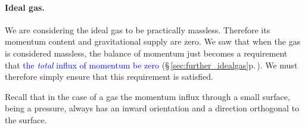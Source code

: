 \documentclass[a4paper,12pt,%
onecolumn,oneside,%
british%
]{memoir}
\renewcommand*{\|}[1][]{\nonscript\:#1\vert\nonscript\:\mathopen{}}
\newcommand*{\sect}{\S}%
\renewcommand*{\autoref}[3][\sect\,\ref]{\textcolor{blue}{#3} {\color{blue}\scriptsize(\faIcon[regular]{eye}\;#1{#2}\;p.\,\pageref{#2})}}
\begin{document}
\bigskip

\paragraph{Ideal gas.}

We are considering the ideal gas to be practically massless. Therefore its momentum content and gravitational supply are zero. We saw that when the gas is considered massless, the balance of momentum just becomes a requirement that \autoref{sec:further_idealgas}{the \emph{total} influx of momentum be zero}. We must therefore simply ensure that this requirement is satisfied.

Recall that in the case of a gas the momentum influx through a small surface, being a pressure, always has an inward orientation and a direction orthogonal to the surface.
\end{document}

